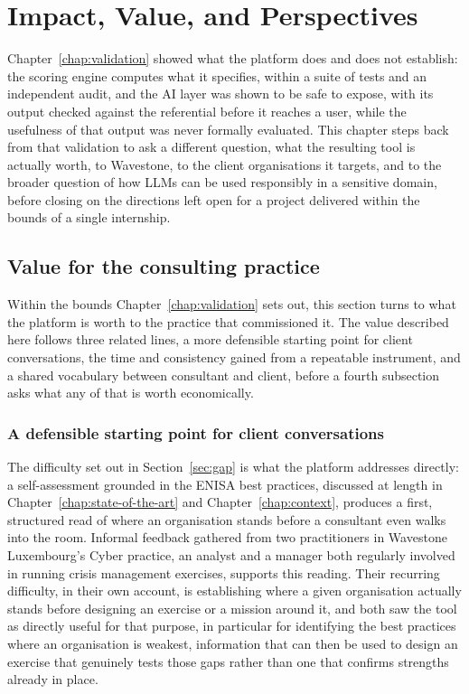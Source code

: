 \chapter{Impact, Value, and Perspectives}
\label{chap:impact}

Chapter~\ref{chap:validation} showed what the platform does and does not establish: the scoring engine computes what it specifies, within a suite of tests and an independent audit, and the AI layer was shown to be safe to expose, with its output checked against the referential before it reaches a user, while the usefulness of that output was never formally evaluated. This chapter steps back from that validation to ask a different question, what the resulting tool is actually worth, to Wavestone, to the client organisations it targets, and to the broader question of how LLMs can be used responsibly in a sensitive domain, before closing on the directions left open for a project delivered within the bounds of a single internship.

\section{Value for the consulting practice}
\label{sec:impact-consulting}

Within the bounds Chapter~\ref{chap:validation} sets out, this section turns to what the platform is worth to the practice that commissioned it. The value described here follows three related lines, a more defensible starting point for client conversations, the time and consistency gained from a repeatable instrument, and a shared vocabulary between consultant and client, before a fourth subsection asks what any of that is worth economically.

\subsection{A defensible starting point for client conversations}
\label{sec:impact-consulting-starting-point}

The difficulty set out in Section~\ref{sec:gap} is what the platform addresses directly: a self-assessment grounded in the ENISA best practices, discussed at length in Chapter~\ref{chap:state-of-the-art} and Chapter~\ref{chap:context}, produces a first, structured read of where an organisation stands before a consultant even walks into the room. Informal feedback gathered from two practitioners in Wavestone Luxembourg's Cyber practice, an analyst and a manager both regularly involved in running crisis management exercises, supports this reading. Their recurring difficulty, in their own account, is establishing where a given organisation actually stands before designing an exercise or a mission around it, and both saw the tool as directly useful for that purpose, in particular for identifying the best practices where an organisation is weakest, information that can then be used to design an exercise that genuinely tests those gaps rather than one that confirms strengths already in place.

